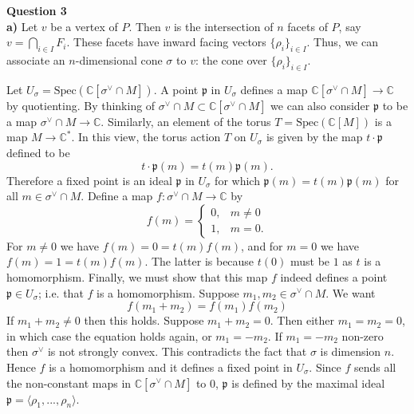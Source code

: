 \documentclass{article}
\newcommand{\C}{\mathbb{C}}
\newcommand{\Spec}{\text{Spec}}
\newcommand{\p}{\mathfrak{p}}
\begin{document}
\pagebreak

\noindent \textbf{Question 3} \\
\textbf{a)} Let $v$ be a vertex of $P$. Then $v$ is the intersection of $n$ facets of $P$, say $v = \bigcap_{i\in I} F_i$. These facets have inward facing vectors $\{\rho_i\}_{i\in I}$. Thus, we can associate an $n$-dimensional cone $\sigma$ to $v$: the cone over $\{\rho_i\}_{i\in I}$. \vspace{1em }

Let $U_\sigma = \Spec(\C[\sigma^\vee \cap M])$. A point $\p$ in $U_\sigma$ defines a map $\C[\sigma^\vee \cap M] \to \C$ by quotienting. By thinking of $\sigma^\vee\cap M \subset \C[\sigma^\vee \cap M]$ we can also consider $\p$ to be a map $\sigma^\vee\cap M\to \C$. Similarly, an element of the torus $T=\Spec(\C[M])$ is a map $M\to \C^\ast$. In this view, the torus action $T$ on $U_\sigma$ is given by the map $t\cdot \p$ defined to be
$$t\cdot \p (m) = t(m)\p(m).$$
Therefore a fixed point is an ideal $\p$ in $U_\sigma$ for which $\p(m) = t(m)\p(m)$ for all $m\in \sigma^\vee\cap M$. Define a map $f:\sigma^\vee\cap M\to \C$ by
$$f(m) = \begin{cases}
	0, & m\neq 0\\
	1, & m=0.
\end{cases}$$
For $m\neq 0$ we have $f(m) = 0 = t(m)f(m)$, and for $m=0$ we have $f(m)=1=t(m)f(m)$. The latter is because $t(0)$ must be $1$ as $t$ is a homomorphism. Finally, we must show that this map $f$ indeed defines a point $\p \in U_\sigma$; i.e. that $f$ is a homomorphism. Suppose $m_1,m_2\in \sigma^\vee\cap M$. We want
$$f(m_1 + m_2) = f(m_1)f(m_2)$$
If $m_1 + m_2 \neq 0$ then this holds. Suppose $m_1+m_2 = 0$. Then either $m_1=m_2=0$, in which case the equation holds again, or $m_1=-m_2$. If $m_1=-m_2$ non-zero then $\sigma^\vee$ is not strongly convex. This contradicts the fact that $\sigma$ is dimension $n$. Hence $f$ is a homomorphism and it defines a fixed point in $U_\sigma$. Since $f$ sends all the non-constant maps in $\C[\sigma^\vee\cap M]$ to 0, $\p$ is defined by the maximal ideal $\p = \langle \rho_1,...,\rho_n \rangle$. \vspace{2em}
\end{document}
